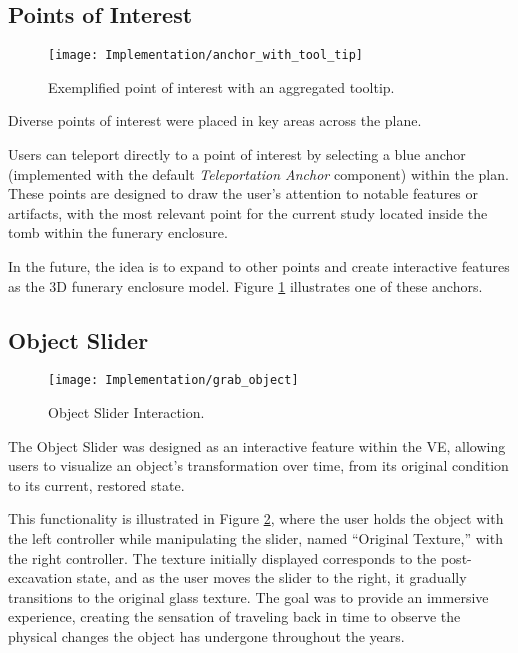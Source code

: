 \subsection*{Points of Interest}
\label{sec:points_interest}

\begin{figure}[h!]
    \centering
    \texttt{[image: Implementation/anchor\_with\_tool\_tip]}
    \caption{Exemplified point of interest with an aggregated tooltip.}
    \label{fig:points_interest}
\end{figure}

Diverse points of interest were placed in key areas across the plane.

Users can teleport directly to a point of interest by selecting a blue anchor (implemented with the default \emph{Teleportation Anchor} component) within the plan. These points are designed to draw the user’s attention to notable features or artifacts, with the most relevant point for the current study located inside the tomb within the funerary enclosure.

In the future, the idea is to expand to other points and create interactive features as the \gls{3D} funerary enclosure model. Figure \ref{fig:points_interest} illustrates one of these anchors.

\subsection*{Object Slider}
\label{sec:object_slider}

 \begin{figure}[h!]
    \centering
    \texttt{[image: Implementation/grab\_object]}
    \caption{Object Slider Interaction.}
    \label{fig:object_slider}
\end{figure}

The Object Slider was designed as an interactive feature within the \gls{VE}, allowing users to visualize an object's transformation over time, from its original condition to its current, restored state. 

This functionality is illustrated in Figure \ref{fig:object_slider}, where the user holds the object with the left controller while manipulating the slider, named “Original Texture,” with the right controller. 
The texture initially displayed corresponds to the post-excavation state, and as the user moves the slider to the right, it gradually transitions to the original glass texture.
The goal was to provide an immersive experience, creating the sensation of traveling back in time to observe the physical changes the object has undergone throughout the years.

